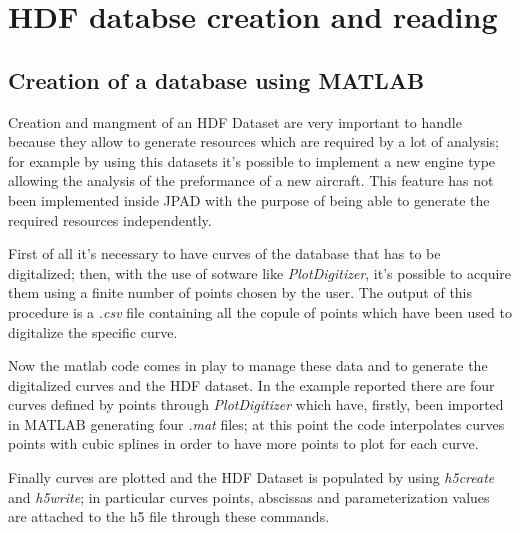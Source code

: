 %
%
\chapter{HDF databse creation and reading }
\label{ch:hdf}

\section{Creation of a database using MATLAB}
Creation and mangment of an HDF Dataset are very important to handle because they allow to generate resources which are required by a lot of analysis; for example by using this datasets it's possible to implement a new engine type allowing the analysis of the preformance of a new aircraft. 
This feature has not been implemented inside JPAD with the purpose of being able to generate the required resources independently.

\bigskip
First of all it's necessary to have curves of the database that has to be digitalized; then, with the use of sotware like \emph{PlotDigitizer}, it's possible to acquire them using a finite number of points chosen by the user.
The output of this procedure is a \emph{.csv} file containing all the copule of points which have been used to digitalize the specific curve.

Now the matlab code comes in play to manage these data and to generate the digitalized curves and the HDF dataset. 
In the example reported there are four curves defined by points through \emph{PlotDigitizer} which have, firstly, been imported in MATLAB generating four \emph{.mat} files; at this point the code interpolates curves points with cubic splines in order to have more points to plot for each curve.

Finally curves are plotted and the HDF Dataset is populated by using \emph{h5create} and \emph{h5write}; in particular curves points, abscissas and parameterization values are attached to the h5 file through these commands.

